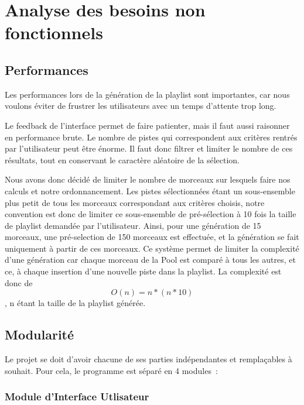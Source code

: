\section{Analyse des besoins non fonctionnels}
\label{besoins:nfonc}

\subsection{Performances}
\label{besoins:nfonc:perf}

Les performances lors de la génération de la playlist sont importantes, car nous
voulons éviter de frustrer les utilisateurs avec un temps d'attente trop long.

Le feedback de l’interface permet de faire patienter, mais il faut aussi 
raisonner en performance brute. Le nombre de pistes qui correspondent aux 
critères rentrés par l’utilisateur peut être énorme. Il faut donc filtrer et 
limiter le nombre de ces résultats, tout en conservant le caractère 
aléatoire de la sélection.

Nous avons donc décidé de limiter le nombre de morceaux sur lesquels faire nos 
calculs et notre ordonnancement. Les pistes sélectionnées étant un 
sous-ensemble plus petit de tous les morceaux correspondant aux critères 
choisis, notre convention est donc de limiter ce sous-ensemble de pré-sélection 
à 10 fois la taille de playlist demandée par l’utilisateur. Ainsi, pour une 
génération de 15 morceaux, une pré-selection de 150 morceaux est effectuée, 
et la génération se fait uniquement à partir de ces morceaux. Ce système permet 
de limiter la complexité d'une génération car chaque morceau de la Pool est 
comparé à tous les autres, et ce, à chaque insertion d'une nouvelle piste dans 
la playlist. La complexité est donc de \[O(n) = n*(n*10)\], n étant la taille 
de la playlist générée.

\subsection{Modularité}
\label{besoins:nfonc:perf:mod}
    
Le projet se doit d'avoir chacune de ses parties indépendantes et remplaçables 
à souhait. Pour cela, le programme est séparé en 4 modules~:

\subsubsection{Module d'Interface Utlisateur}
\label{besoins:nfonc:perf:mod:iu}

